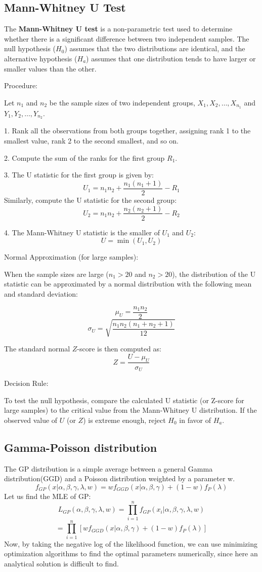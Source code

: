 \documentclass[conference]{IEEEtran}
\begin{document}
\subsection{Mann-Whitney U Test}
The \textbf{Mann-Whitney U test} is a non-parametric test used to determine whether there is a significant difference between two independent samples. The null hypothesis (\(H_0\)) assumes that the two distributions are identical, and the alternative hypothesis (\(H_a\)) assumes that one distribution tends to have larger or smaller values than the other.


Procedure:

Let \( n_1 \) and \( n_2 \) be the sample sizes of two independent groups, \( X_1, X_2, \dots, X_{n_1} \) and \( Y_1, Y_2, \dots, Y_{n_2} \).

1. Rank all the observations from both groups together, assigning rank 1 to the smallest value, rank 2 to the second smallest, and so on.

2. Compute the sum of the ranks for the first group \( R_1 \).

3. The U statistic for the first group is given by:
\[
U_1 = n_1 n_2 + \frac{n_1(n_1 + 1)}{2} - R_1
\]
Similarly, compute the U statistic for the second group:
\[
U_2 = n_1 n_2 + \frac{n_2(n_2 + 1)}{2} - R_2
\]

4. The Mann-Whitney U statistic is the smaller of \( U_1 \) and \( U_2 \):
\[
U = \min(U_1, U_2)
\]

Normal Approximation (for large samples):

When the sample sizes are large (\(n_1 > 20\) and \(n_2 > 20\)), the distribution of the U statistic can be approximated by a normal distribution with the following mean and standard deviation:

\[
\mu_U = \frac{n_1 n_2}{2}
\]
\[
\sigma_U = \sqrt{\frac{n_1 n_2 (n_1 + n_2 + 1)}{12}}
\]

The standard normal \( Z \)-score is then computed as:
\[
Z = \frac{U - \mu_U}{\sigma_U}
\]

Decision Rule:

To test the null hypothesis, compare the calculated U statistic (or Z-score for large samples) to the critical value from the Mann-Whitney U distribution. If the observed value of \( U \) (or \( Z \)) is extreme enough, reject \( H_0 \) in favor of \( H_a \).

\subsection{Gamma-Poisson distribution}
The GP distribution is a simple average between a general Gamma distribution(GGD) and a Poisson distribution weighted by a parameter w.
\[f_{GP}(x|\alpha, \beta, \gamma, \lambda, w) = wf_{GGD}(x|\alpha, \beta, \gamma) + (1-w)f_P(\lambda)\]
Let us find the MLE of GP:
\[L_{GP}(\alpha, \beta, \gamma, \lambda, w) = \prod_{i=1}^n f_{GP}(x_i|\alpha, \beta, \gamma, \lambda, w)\]
\[= \prod_{i=1}^n [wf_{GGD}(x|\alpha, \beta, \gamma) + (1-w)f_P(\lambda)]\]
Now, by taking the negative log of the likelihood function, we can use minimizing optimization algorithms to find the optimal parameters numerically, since here an analytical solution is difficult to find.
\end{document}
